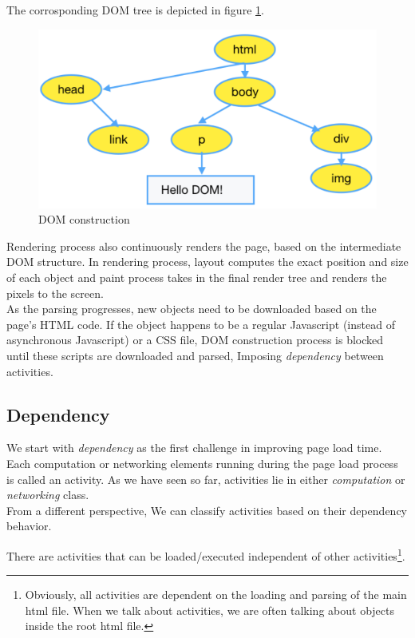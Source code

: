 \noindent The corrosponding DOM tree is depicted in figure \ref{fig:dom}.
 \begin{figure}[!htb]
  \centering
    \includegraphics[width=0.85 \textwidth]{./figures/introduction/dom.pdf}
  \caption {DOM construction}
  \label{fig:dom}
\end{figure}

\noindent Rendering process also continuously renders the page, based on the intermediate DOM structure.
In rendering process, layout computes the exact position and size of each object and paint process takes in the final render tree and renders the pixels to the screen.\\

\noindent As the parsing progresses, new objects need to be downloaded based on the page's HTML code. If the object happens to be a regular Javascript (instead of asynchronous Javascript) or a CSS file, DOM construction process is blocked until these scripts are downloaded and parsed, Imposing {\em dependency} between activities.


\subsection{Dependency}
We start with {\em dependency} as the first challenge in improving page load time.
Each computation or networking elements running during the page load process is called an activity. 
As we have seen so far, activities lie in either {\em computation} or {\em networking} class. \\

\noindent From a different perspective, We can classify activities based on their dependency behavior.

\noindent There are activities that can be loaded/executed independent of  other activities\footnote{Obviously, all activities are dependent on the loading and parsing of the main html file. When we talk about activities, we are often talking about objects inside the root html file.}. \\

